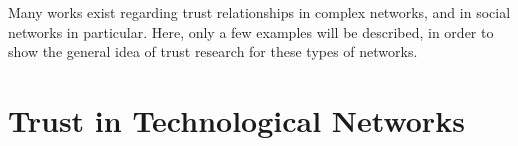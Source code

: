 Many works exist regarding trust relationships in complex networks, and in social networks in particular.
Here, only a few examples will be described, in order to show the general idea of trust research for these types of networks.



\section{Trust in Technological Networks}

